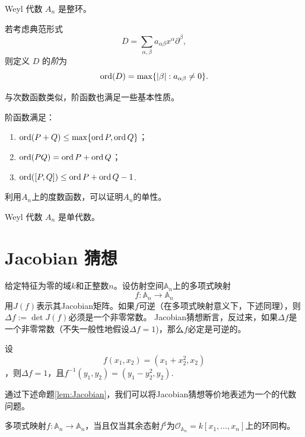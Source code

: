 \documentclass[12pt,a4paper]{ctexrep}   %
\begin{document}
\begin{corollary}
    Weyl 代数 $A_n$ 是整环。
\end{corollary}

\begin{definition}
    若考虑典范形式
    \[
        D=\sum_{\alpha,\beta}
        a_{\alpha\beta}x^\alpha\partial^\beta,
    \]
    则定义 $D$ 的\emph{阶}为
    \[
        \operatorname{ord}(D)=\max\{|\beta|:a_{\alpha\beta}\neq0\}.
    \]
\end{definition}
与次数函数类似，阶函数也满足一些基本性质。
\begin{proposition}
    阶函数满足：
    \begin{enumerate}
        \item
              $\operatorname{ord}(P+Q)\le\max\{\operatorname{ord} P,\operatorname{ord} Q\}$；
        \item
              $\operatorname{ord}(PQ)=\operatorname{ord} P+\operatorname{ord} Q$；
        \item
              $\operatorname{ord}([P,Q])\le\operatorname{ord} P+\operatorname{ord} Q-1$.
    \end{enumerate}
\end{proposition}

利用$A_n$上的度数函数，可以证明$A_n$的单性。

\begin{theorem}
    \label{thm:simple}
    Weyl 代数 $A_n$ 是单代数。
\end{theorem}
\section{Jacobian 猜想}
给定特征为零的域$k$和正整数$n$。设仿射空间$\mathbb{A}_n$上的多项式映射
\begin{equation*}
    f:\mathbb{A}_n\to \mathbb{A}_n
\end{equation*}
用$J(f)$表示其Jacobian矩阵。如果$f$可逆（在多项式映射意义下，下述同理），则$\Delta f:=\det J(f)$必须是一个非零常数。
Jacobian猜想断言，反过来，如果$\Delta f$是一个非零常数（不失一般性地假设$\Delta f=1$)，那么$f$必定是可逆的。
\begin{example}
    设
    \begin{equation*}
        f(x_1,x_2)=(x_1+x_2^2,x_2)
    \end{equation*}
    ，则$\Delta f=1$，且$f^{-1}(y_1,y_2)=(y_1-y_2^2,y_2)$.
\end{example}

通过下述命题\ref{lem:Jacobian}，我们可以将Jacobian猜想等价地表述为一个的代数问题。
\begin{proposition}
    \label{pro:Jacobian}
    多项式映射$f:\mathbb{A}_n\to \mathbb{A}_n$，当且仅当其余态射$f^\sharp$为$\mathcal{O}_{\mathbb{A}_n}=k[x_1,\dots,x_n]$上的环同构。
\end{proposition}
\end{document}
